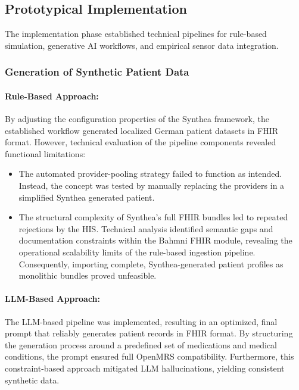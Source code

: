 \subsection*{Prototypical Implementation}
The implementation phase established technical pipelines for rule-based simulation, generative AI workflows, and empirical sensor data integration.

\subsubsection*{Generation of Synthetic Patient Data}
\begin{sloppypar}
\paragraph*{Rule-Based Approach:} By adjusting the configuration properties of the Synthea framework, the established workflow generated localized German patient datasets in FHIR format. However, technical evaluation of the pipeline components revealed functional limitations:

\begin{itemize}
\item The automated provider-pooling strategy failed to function as intended. Instead, the concept was tested by manually replacing the providers in a simplified Synthea generated patient. 
\item The structural complexity of Synthea's full FHIR bundles led to repeated rejections by the HIS. Technical analysis identified semantic gaps and documentation constraints within the Bahmni FHIR module, revealing the operational scalability limits of the rule-based ingestion pipeline. Consequently, importing complete, Synthea-generated patient profiles as monolithic bundles proved unfeasible.
\end{itemize}
\end{sloppypar}

\paragraph*{LLM-Based Approach:} The LLM-based pipeline was implemented, resulting in an optimized, final prompt that reliably generates patient records in FHIR format. By structuring the generation process around a predefined set of medications and medical conditions, the prompt ensured full OpenMRS compatibility. Furthermore, this constraint-based approach mitigated LLM hallucinations, yielding consistent synthetic data.

